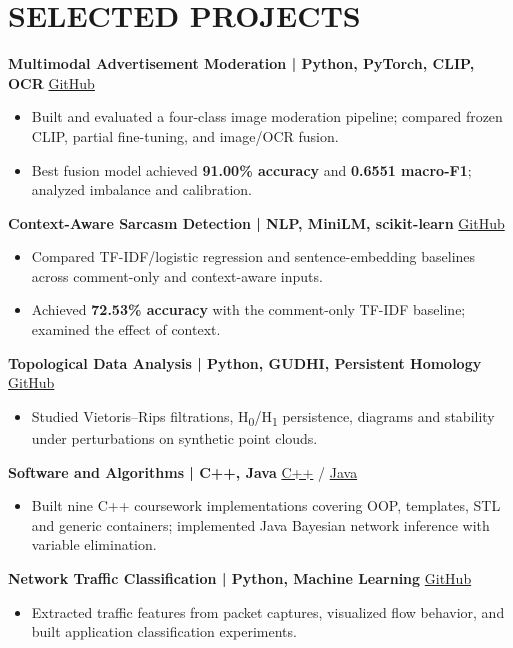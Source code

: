 \documentclass[10pt,a4paper]{article}
\begin{document}
\section*{SELECTED PROJECTS}
\textbf{Multimodal Advertisement Moderation \quad | \quad Python, PyTorch, CLIP, OCR} \hfill \href{https://github.com/naamaskital/sVLM_ads_project}{GitHub}
\begin{itemize}
\item Built and evaluated a four-class image moderation pipeline; compared frozen CLIP, partial fine-tuning, and image/OCR fusion.
\item Best fusion model achieved \textbf{91.00\% accuracy} and \textbf{0.6551 macro-F1}; analyzed imbalance and calibration.
\end{itemize}
\textbf{Context-Aware Sarcasm Detection \quad | \quad NLP, MiniLM, scikit-learn} \hfill \href{https://github.com/naamaskital/sarcasm_context_project}{GitHub}
\begin{itemize}
\item Compared TF-IDF/logistic regression and sentence-embedding baselines across comment-only and context-aware inputs.
\item Achieved \textbf{72.53\% accuracy} with the comment-only TF-IDF baseline; examined the effect of context.
\end{itemize}
\textbf{Topological Data Analysis \quad | \quad Python, GUDHI, Persistent Homology} \hfill \href{https://github.com/naamaskital/topological-data-analysis}{GitHub}
\begin{itemize}
\item Studied Vietoris--Rips filtrations, H\textsubscript{0}/H\textsubscript{1} persistence, diagrams and stability under perturbations on synthetic point clouds.
\end{itemize}
\textbf{Software and Algorithms \quad | \quad C++, Java} \hfill \href{https://github.com/naamaskital/cpp-programming-projects}{C++} / \href{https://github.com/naamaskital/bayesian-network-inference-java}{Java}
\begin{itemize}
\item Built nine C++ coursework implementations covering OOP, templates, STL and generic containers; implemented Java Bayesian network inference with variable elimination.
\end{itemize}
\textbf{Network Traffic Classification \quad | \quad Python, Machine Learning} \hfill \href{https://github.com/naamaskital/Network-Traffic-Analysis}{GitHub}
\begin{itemize}
\item Extracted traffic features from packet captures, visualized flow behavior, and built application classification experiments.
\end{itemize}
\end{document}
